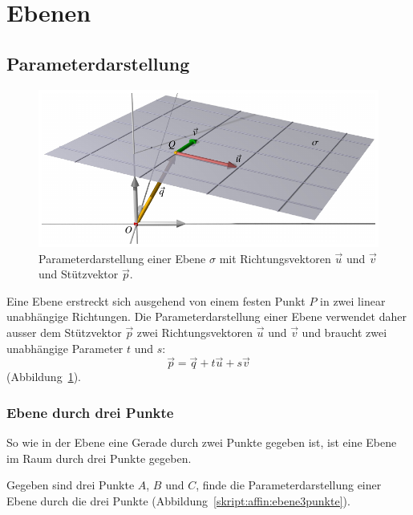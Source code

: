 %
%
%
\section{Ebenen\label{section:ebenen}}

\subsection{Parameterdarstellung}
\begin{figure}
\centering
\includegraphics{3/images/ebene.pdf}
\caption{Parameterdarstellung einer Ebene $\sigma$ mit Richtungsvektoren
$\vec{u}$ und $\vec{v}$ und Stützvektor $\vec{p}$.
\label{skript:affin:ebene}}
\end{figure}
Eine Ebene erstreckt sich ausgehend von einem festen Punkt $P$ in
zwei linear unabhängige Richtungen.
Die Parameterdarstellung einer Ebene verwendet daher ausser dem
Stützvektor $\vec{p}$ zwei Richtungsvektoren $\vec{u}$ und $\vec{v}$
und braucht zwei unabhängige Parameter $t$ und $s$:
\begin{equation}
\vec{p}
=
\vec{q} + t\vec{u} + s\vec{v}
\label{skript:affin:ebene:parameterdarstellung}
\end{equation}
(Abbildung~\ref{skript:affin:ebene}).

\subsubsection{Ebene durch drei Punkte}
So wie in der Ebene eine Gerade durch zwei Punkte gegeben ist, ist eine
Ebene im Raum durch drei Punkte gegeben.

\begin{aufgabe}
Gegeben sind drei Punkte $A$, $B$ und $C$, finde die Parameterdarstellung einer
Ebene durch die drei Punkte (Abbildung~\ref{skript:affin:ebene3punkte}).
\end{aufgabe}

